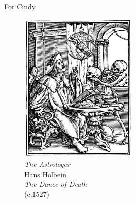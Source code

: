 
\noindent For Cindy

%

\begin{figure}
    \vspace{50pt}
    \centering
    \includegraphics[width=0.50\textwidth]{assets/holbein-astrologer.jpg}
    \\
    \emph{The Astrologer}
    \\
    Hans Holbein
    \\
    \emph{The Dance of Death}
    \\
    (c.1527)
\end{figure}